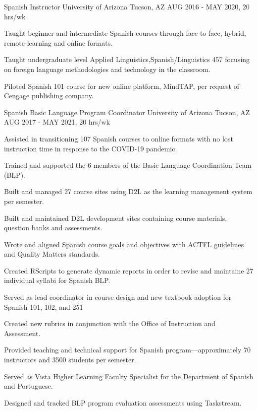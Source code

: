 \begin{cventries}

\cventry
{Spanish Instructor} %
{University of Arizona} %
{Tucson, AZ} %
{AUG 2016 - MAY 2020, 20 hrs/wk} %
{ %
\begin{cvitems}
\item {Taught beginner and intermediate Spanish courses through face-to-face, hybrid, remote-learning and online formats.}
\item {Taught undergraduate level Applied Linguistics,Spanish/Linguistics 457 focusing on foreign language methodologies and technology in the classroom.} 
\item {Piloted Spanish 101 course for new online platform, MindTAP, per request of Cengage publishing company.}
\end{cvitems}
}


\cventry
{Spanish Basic Language Program Coordinator} %
{University of Arizona} %
{Tucson, AZ} %
{AUG 2017 - MAY 2021, 20 hrs/wk} %
{ %
\begin{cvitems}
\item {Assisted in transitioning 107 Spanish courses to online formats with no lost instruction time in response to the COVID-19 pandemic.}
\item {Trained and supported the 6 members of the Basic Language Coordination Team (BLP).}
\item {Built and managed 27 course sites using D2L as the learning management system per semester.}
\item {Built and maintained D2L development sites containing course materials, question banks and assessments.}
\item {Wrote and aligned Spanish course goals and objectives with ACTFL guidelines and Quality Matters standards.}
\item {Created RScripts to generate dynamic reports in order to revise and maintaine 27 individual syllabi for Spanish BLP.}
\item {Served as lead coordinator in course design and new textbook adoption for Spanish 101, 102, and 251}
\item {Created new rubrics in conjunction with the Office of Instruction and Assessment.}
\item {Provided teaching and technical support for Spanish program---approximately 70 instructors and 3500 students per semester.}
\item {Served as Vista Higher Learning Faculty Specialist for the Department of Spanish and Portuguese.}
\item {Designed and tracked BLP program evaluation assessments using Taskstream.}
\end{cvitems}
}


\end{cventries}
